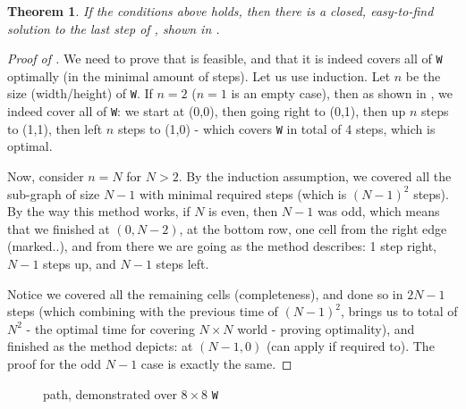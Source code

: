 \documentclass[a4paper,11pt]{article}
\newtheorem{theorem}{Theorem}
\theoremstyle{definition}
\newcommand{\opp}{{{\sf O}}\xspace}
\newcommand{\io}{{\ensuremath{i_{\opp}}}\xspace}
\newcommand{\w}{{{\texttt W}}\xspace}
\newcommand{\ltr}{{{\sf{LTR}}}\xspace}
\begin{document}
\begin{theorem}
If the conditions above holds, then there is a closed, easy-to-find solution to the last step of \ltr, shown in .
\label{theorems: ltr solution under assumptions}
\end{theorem}

\begin{proof}[Proof of ]

We need to prove that  is feasible, and that it is indeed covers all of \w optimally (in the minimal amount of steps). 
Let us use induction. Let $n$ be the size (width/height) of \w.
If $n=2$ ($n=1$ is an empty case), then as shown in , we indeed cover all of \w: we start at (0,0), then going right to (0,1), then up $n$ steps to (1,1), then left $n$ steps to (1,0) - which covers \w in total of 4 steps, which is optimal.

Now, consider $n=N$ for $N>2$. By the induction assumption, we covered all the sub-graph of size $N-1$ with minimal required steps (which is $(N-1)^2$ steps). By the way this method works, if $N$ is even, then $N-1$ was odd, which means that we finished at $(0,N-2)$, at the bottom row, one cell from the right edge (marked..), and from there we are going as the method describes: 1 step right, $N-1$ steps up, and $N-1$ steps left.

Notice we covered all the remaining cells (completeness), and done so in $2N-1$ steps (which combining with the previous time of $(N-1)^2$, brings us to total of $N^2$ - the optimal time for covering $N\times N$ world - proving optimality), and finished as the method depicts: at $(N-1,0)$ (can apply  if required to).
The proof for the odd $N-1$ case is exactly the same.
\end{proof}

\begin{figure}
    \centering
    \caption{\ltr path, demonstrated over $8\times 8$ \w}
    \label{figures: ltr graph}
\end{figure}
\end{document}
